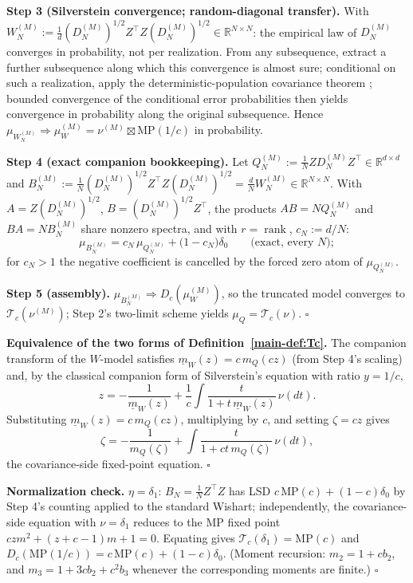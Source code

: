 \textbf{Step 3 (Silverstein convergence; random-diagonal transfer).} With $W_N^{(M)}:=\frac1d(D_N^{(M)})^{1/2}Z^\top Z(D_N^{(M)})^{1/2}\in\mathbb R^{N\times N}$: the empirical law of $D_N^{(M)}$ converges in probability, not per realization. From any subsequence, extract a further subsequence along which this convergence is almost sure; conditional on such a realization, apply the deterministic-population covariance theorem \cite{silverstein1995strong,bai2010spectral}; bounded convergence of the conditional error probabilities then yields convergence in probability along the original subsequence. Hence $\mu_{W_N^{(M)}}\Rightarrow\mu_W^{(M)}=\nu^{(M)}\boxtimes\mathrm{MP}(1/c)$ in probability.

\textbf{Step 4 (exact companion bookkeeping).} Let $Q_N^{(M)}:=\frac1NZD_N^{(M)}Z^\top\in\mathbb R^{d\times d}$ and $B_N^{(M)}:=\frac1N(D_N^{(M)})^{1/2}Z^\top Z(D_N^{(M)})^{1/2}=\frac dNW_N^{(M)}\in\mathbb R^{N\times N}$. With $A=Z(D_N^{(M)})^{1/2}$, $B=(D_N^{(M)})^{1/2}Z^\top$, the products $AB=NQ_N^{(M)}$ and $BA=NB_N^{(M)}$ share nonzero spectra, and with $r=\operatorname{rank}$, $c_N:=d/N$:
\[
\mu_{B_N^{(M)}}=c_N\,\mu_{Q_N^{(M)}}+\big(1-c_N\big)\delta_0\qquad\text{(exact, every }N\text{)};
\]
for $c_N>1$ the negative coefficient is cancelled by the forced zero atom of $\mu_{Q_N^{(M)}}$.

\textbf{Step 5 (assembly).} $\mu_{B_N^{(M)}}\Rightarrow D_c(\mu_W^{(M)})$, so the truncated model converges to $\mathcal T_c(\nu^{(M)})$; Step 2's two-limit scheme yields $\mu_Q=\mathcal T_c(\nu)$. $\square$

\textbf{Equivalence of the two forms of Definition~\ref{main-def:Tc}.} The companion transform of the $W$-model satisfies $\underline m_W(z)=c\,m_Q(cz)$ (from Step 4's scaling) and, by the classical companion form of Silverstein's equation with ratio $y=1/c$,
\[
z=-\frac1{\underline m_W(z)}+\frac1c\int\frac{t}{1+t\,\underline m_W(z)}\,\nu(dt).
\]
Substituting $\underline m_W(z)=c\,m_Q(cz)$, multiplying by $c$, and setting $\zeta=cz$ gives
\[
\zeta=-\frac1{m_Q(\zeta)}+\int\frac{t}{1+ct\,m_Q(\zeta)}\,\nu(dt),
\]
the covariance-side fixed-point equation. $\square$

\textbf{Normalization check.} $\eta=\delta_1$: $B_N=\frac1NZ^\top Z$ has LSD $c\,\mathrm{MP}(c)+(1-c)\delta_0$ by Step 4's counting applied to the standard Wishart; independently, the covariance-side equation with $\nu=\delta_1$ reduces to the MP fixed point $czm^2+(z+c-1)m+1=0$. Equating gives $\mathcal T_c(\delta_1)=\mathrm{MP}(c)$ and $D_c(\mathrm{MP}(1/c))=c\,\mathrm{MP}(c)+(1-c)\delta_0$. (Moment recursion: $m_2=1+cb_2$, and $m_3=1+3cb_2+c^2b_3$ whenever the corresponding moments are finite.) $\square$


